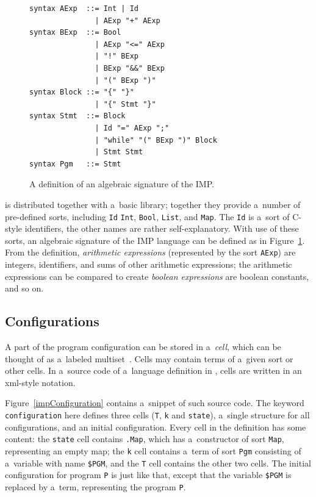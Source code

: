 \documentclass{fithesis3}
\begin{document}
\begin{figure}[h]
\begin{lstlisting}
syntax AExp  ::= Int | Id
               | AExp "+" AExp
syntax BExp  ::= Bool
               | AExp "<=" AExp
               | "!" BExp
               | BExp "&&" BExp
               | "(" BExp ")"
syntax Block ::= "{" "}"
               | "{" Stmt "}"
syntax Stmt  ::= Block
               | Id "=" AExp ";"
               | "while" "(" BExp ")" Block
               | Stmt Stmt
syntax Pgm   ::= Stmt
\end{lstlisting}
\caption{A definition of an algebraic signature of the IMP.}
\label{impSyntax}
\end{figure}

\K is distributed together with a~basic library; together they provide a~number of pre-defined sorts, including \texttt{Id} \texttt{Int}, \texttt{Bool}, \texttt{List}, and \texttt{Map}. The \texttt{Id} is a~sort of C-style identifiers, the other names are rather self-explanatory. With use of these sorts, an algebraic signature of the IMP language can be defined as in Figure~\ref{impSyntax}. From the definition, \textit{arithmetic expressions} (represented by the sort \texttt{AExp}) are integers, identifiers, and sums of other arithmetic expressions; the arithmetic expressions can be compared to create \textit{boolean expressions} are boolean constants, and so on.

\subsection{Configurations}

A part of the program configuration can be stored in a~\textit{cell}, which can be thought of as a~labeled multiset~\cite{hathhorn-ellison-rosu-2015-pldi}. Cells may contain terms of a~given sort or other cells. In a~source code of a~language definition in \K, cells are written in an xml-style notation.

Figure~\ref{impConfiguration} contains a~snippet of such source code. The keyword \texttt{configuration} here defines three cells (\texttt{T}, \texttt{k} and \texttt{state}), a~single structure for all configurations, and an initial configuration. Every cell in the definition has some content: the \texttt{state} cell contains \lstinline{.Map}, which has a~constructor of sort \texttt{Map}, representing an empty map; the \texttt{k} cell contains a~term of sort \texttt{Pgm} consisting of a~variable with name \texttt{\$PGM}, and the \texttt{T} cell contains the other two cells. The initial configuration for program \texttt{P} is just like that, except that the variable \texttt{\$PGM} is replaced by a~term, representing the program \texttt{P}.
\end{document}
